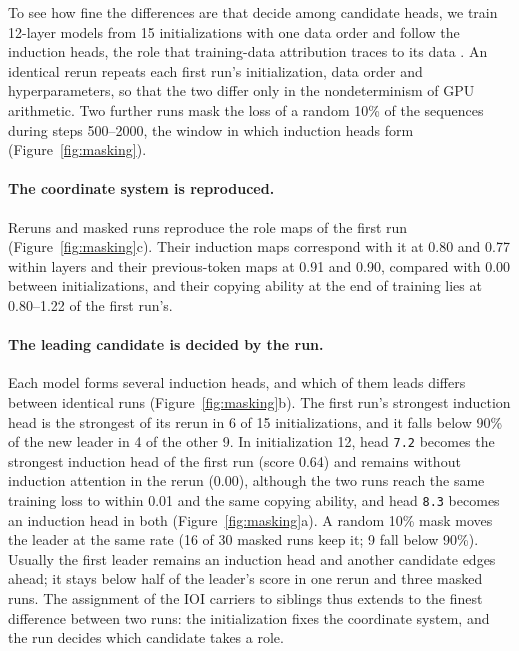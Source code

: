 \documentclass[11pt]{article}
\newcommand{\head}[1]{\texttt{#1}}
\begin{document}
To see how fine the differences are that decide among candidate heads, we train 12-layer models from 15 initializations with one data order and follow the induction heads, the role that training-data attribution traces to its data \citep{chen2026mechanistic}.
An identical rerun repeats each first run's initialization, data order and hyperparameters, so that the two differ only in the nondeterminism of GPU arithmetic.
Two further runs mask the loss of a random 10\% of the sequences during steps 500--2000, the window in which induction heads form (Figure~\ref{fig:masking}).

\paragraph{The coordinate system is reproduced.}
Reruns and masked runs reproduce the role maps of the first run (Figure~\ref{fig:masking}c).
Their induction maps correspond with it at 0.80 and 0.77 within layers and their previous-token maps at 0.91 and 0.90, compared with 0.00 between initializations, and their copying ability at the end of training lies at 0.80--1.22 of the first run's.

\paragraph{The leading candidate is decided by the run.}
Each model forms several induction heads, and which of them leads differs between identical runs (Figure~\ref{fig:masking}b).
The first run's strongest induction head is the strongest of its rerun in 6 of 15 initializations, and it falls below 90\% of the new leader in 4 of the other 9.
In initialization 12, head \head{7.2} becomes the strongest induction head of the first run (score 0.64) and remains without induction attention in the rerun (0.00), although the two runs reach the same training loss to within 0.01 and the same copying ability, and head \head{8.3} becomes an induction head in both (Figure~\ref{fig:masking}a).
A random 10\% mask moves the leader at the same rate (16 of 30 masked runs keep it; 9 fall below 90\%).
Usually the first leader remains an induction head and another candidate edges ahead; it stays below half of the leader's score in one rerun and three masked runs.
The assignment of the IOI carriers to siblings thus extends to the finest difference between two runs: the initialization fixes the coordinate system, and the run decides which candidate takes a role.
\end{document}
